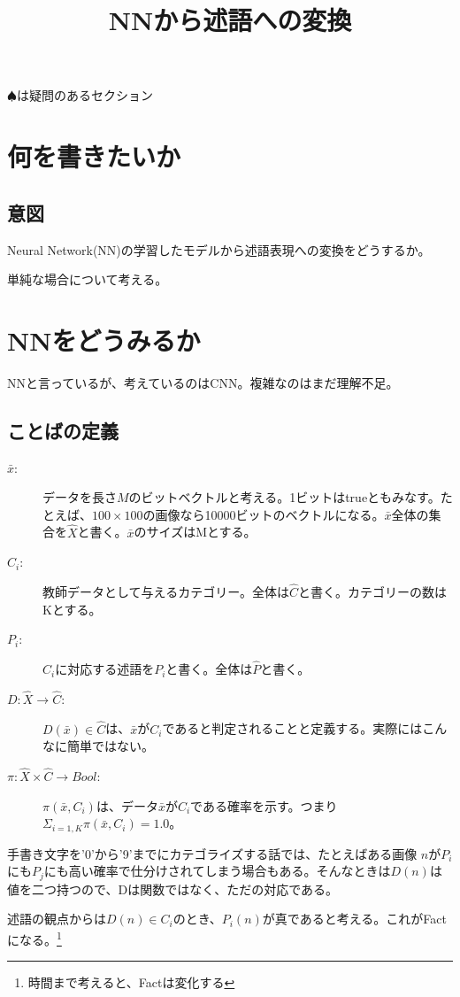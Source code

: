 \documentclass[10pt, oneside]{jarticle}   	%
\title{NNから述語への変換}
\author{\myname}
\begin{document}
\maketitle
\tableofcontents
$\spadesuit$は疑問のあるセクション
\newpage

\section{何を書きたいか}
\subsection{意図}
Neural Network(NN)の学習したモデルから述語表現への変換をどうするか。

単純な場合について考える。

\section{NNをどうみるか}
NNと言っているが、考えているのはCNN。複雑なのはまだ理解不足。

\subsection{ことばの定義}
\begin{description}
\item[$\bar{x}$: ] データを長さ$M$のビットベクトルと考える。1ビットはtrueともみなす。たとえば、$100\times 100$の画像なら10000ビットのベクトルになる。$\bar{x}$全体の集合を$\hat{X}$と書く。$\bar{x}$のサイズはMとする。
\item[$C_i$:] 教師データとして与えるカテゴリー。全体は$\hat{C}$と書く。カテゴリーの数はKとする。
\item[$P_i$:] $C_i$に対応する述語を$P_i$と書く。全体は$\hat{P}$と書く。
\item[$D: \hat{X} \rightarrow \hat{C}$:] $D(\bar{x}) \in \hat{C}$は、$\bar{x}$が$C_i$であると判定されることと定義する。実際にはこんなに簡単ではない。
\item[$\pi: \hat{X} \times \hat{C} \rightarrow Bool$: ] $\pi(\bar{x}, C_i)$は、データ$\bar{x}$が$C_i$である確率を示す。つまり$\Sigma_{i=1,K} \pi(\bar{x},C_i) = 1.0$。
\end{description}

手書き文字を'0'から'9'までにカテゴライズする話では、たとえばある画像 $n$が$P_i$にも$P_j$にも高い確率で仕分けされてしまう場合もある。そんなときは$D(n)$は値を二つ持つので、Dは関数ではなく、ただの対応である。

述語の観点からは$D(n) \in C_i$のとき、$P_i(n)$が真であると考える。これがFactになる。\footnote{時間まで考えると、Factは変化する}
\end{document}
